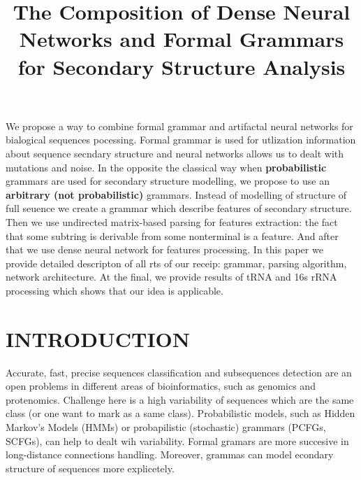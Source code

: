 \documentclass[a4paper,twoside]{article}
\begin{document}
\title{The Composition of Dense Neural Networks and Formal Grammars for Secondary Structure Analysis}

\author{
}


\abstract
{
We propose a way to combine formal grammar and artifactal neural networks for bialogical sequences pocessing.
Formal grammar is used for utlization information about sequence secndary structure and neural networks allows us to dealt with mutations and noise.
In the opposite the classical way when \textbf{probabilistic} grammars are used for secondary structure modelling, we propose to use an \textbf{arbitrary (not probabilistic)} grammars.
Instead of modelling of structure of full seuence we create a grammar which describe features of secondary structure.
Then we use undirected matrix-based parsing for features extraction: the fact that some subtring is derivable from some nonterminal is a feature. 
And after that we use dense neural network for features processing.
In this paper we provide detailed descripton of all rts of our receip: grammar, parsing algorithm, network architecture.
At the final, we provide results of tRNA and 16s rRNA processing which shows that our idea is applicable.
}

\onecolumn \maketitle \normalsize \vfill

\section{\uppercase{Introduction}}
\label{sec:introduction}

\noindent Accurate, fast, precise sequences classification and subsequences detection are an open problems in different areas of bioinformatics, such as genomics and protenomics. 
Challenge here is a high variability of sequences which are the same class (or one want to mark as a same class).
Probabilistic models, such as Hidden Markov's Models (HMMs) or probapilistic (stochastic) grammars (PCFGs, SCFGs), can help to dealt wih variability.
Formal gramars are more succesive in long-distance connections handling.
Moreover, grammas can model econdary structure of sequences more explicetely.
\end{document}
